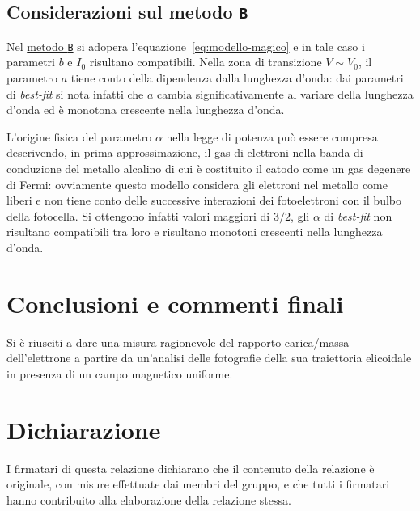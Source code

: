 \documentclass[10pt, a4paper, italian]{article}
\begin{document}
\subsection{Considerazioni sul metodo \texttt{B}}
Nel \hyperref[sec:metodoB]{metodo \texttt{B}} si adopera l'equazione~\eqref{eq:modello-magico} e in tale caso i parametri $ b $ e $ I_{0} $ risultano compatibili. Nella zona di transizione $ V\sim V_{0} $, il parametro $ a $ tiene conto della dipendenza dalla lunghezza d'onda: dai parametri di \emph{best-fit} si nota infatti che $ a $ cambia significativamente al variare della lunghezza d'onda ed è monotona crescente nella lunghezza d'onda.

L'origine fisica del parametro $\alpha$ nella legge di potenza può essere compresa descrivendo, in prima approssimazione, il gas di elettroni nella banda di conduzione del metallo alcalino di cui è costituito il catodo come un gas degenere di Fermi: ovviamente questo modello considera gli elettroni nel metallo come liberi e non tiene conto delle successive interazioni dei fotoelettroni con il bulbo della fotocella. Si ottengono infatti valori maggiori di $ 3/2 $, gli $ \alpha $ di \emph{best-fit} non risultano compatibili tra loro e risultano monotoni crescenti nella lunghezza d'onda.



\section*{Conclusioni e commenti finali}
Si è riusciti a dare una misura ragionevole del rapporto carica/massa
dell'elettrone a partire da un'analisi delle fotografie della sua traiettoria
elicoidale in presenza di un campo magnetico uniforme.

\section*{Dichiarazione}
I firmatari di questa relazione dichiarano che il contenuto della relazione \`e
originale, con misure effettuate dai membri del gruppo, e che tutti i firmatari
hanno contribuito alla elaborazione della relazione stessa.

\begin{thebibliography}{1}
\end{thebibliography}
\end{document}
